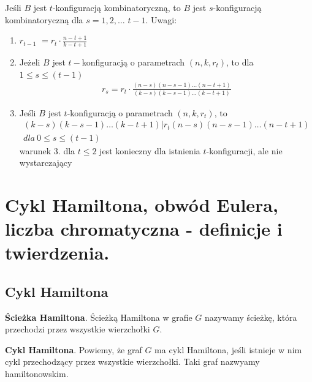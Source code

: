 \documentclass[12pt]{article}
\begin{document}
    \begin{theorem}
        Jeśli $B$ jest $t$-konfiguracją kombinatoryczną, to
        $B$ jest $s$-konfiguracją kombinatoryczną dla $s = 1, 2,\dots$ $t-1$.
        Uwagi:
        \begin{enumerate}
            \item $r_{t-1}$ $= r_t \cdot \frac{n-t+1}{k-t+1}$
            \item Jeżeli $B$ jest $t-$konfiguracją o parametrach $(n,k,r_t)$, to dla $1 \leq s \leq (t-1)$
            \begin{align*}
                r_s = r_t \cdot \frac{(n-s)(n-s-1)\dots(n-t+1)}{(k-s)(k-s-1)\dots(k-t+1)}
            \end{align*}
            \item Jeśli $B$ jest $t$-konfiguracją o parametrach $(n,k,r_t)$, to
            \begin{align*}
                (k-s)(k-s-1)\dots(k-t+1)|r_t(n-s)(n-s-1)\dots(n-t+1) \\ dla\  0\leq s \leq (t-1)
            \end{align*}
            warunek 3. dla $t\leq 2$ jest konieczny dla istnienia $t$-konfiguracji, ale nie wystarczający
        \end{enumerate}
    \end{theorem}

    \newpage

    \section{Cykl Hamiltona, obwód Eulera, liczba chromatyczna - definicje i twierdzenia.}

    \subsection{Cykl Hamiltona}
    \begin{definition}
        \textbf{Ścieżka Hamiltona}. Ścieżką Hamiltona w grafie $G$ nazywamy ścieżkę, która przechodzi przez wszystkie
        wierzchołki $G$.
    \end{definition}

    \begin{definition}
        \textbf{Cykl Hamiltona}. Powiemy, że graf $G$ ma cykl Hamiltona, jeśli istnieje w nim cykl przechodzący przez
        wszystkie wierzchołki. Taki graf nazwyamy hamiltonowskim.
    \end{definition}
\end{document}
